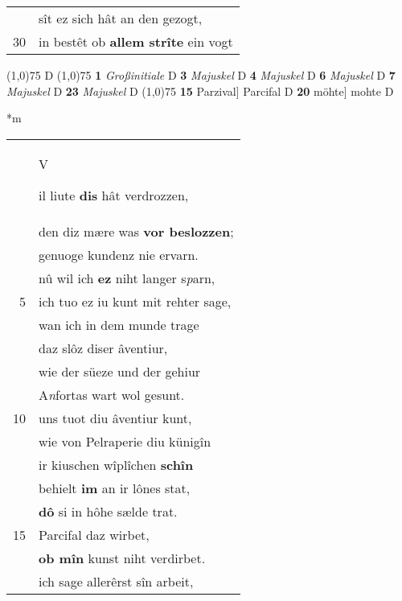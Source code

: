 \documentclass[8pt,a4paper,notitlepage]{article}
\begin{document}
\begin{table}[ht]
\begin{minipage}[t]{0.5\linewidth}
\begin{tabular}{rl}
 & sît ez sich hât an den gezogt,\\ 
30 & in bestêt ob \textbf{allem strîte} ein vogt\\ 
\end{tabular}
\scriptsize
\line(1,0){75} \newline
D \newline
\line(1,0){75} \newline
\textbf{1} \textit{Großinitiale} D  \textbf{3} \textit{Majuskel} D  \textbf{4} \textit{Majuskel} D  \textbf{6} \textit{Majuskel} D  \textbf{7} \textit{Majuskel} D  \textbf{23} \textit{Majuskel} D  \newline
\line(1,0){75} \newline
\textbf{15} Parzival] Parcifal D \textbf{20} möhte] mohte D \newline
\end{minipage}
\hspace{0.5cm}
\begin{minipage}[t]{0.5\linewidth}
\small
\begin{center}*m
\end{center}
\begin{tabular}{rl}
 & \begin{large}V\end{large}il liute \textbf{dis} hât verdrozzen,\\ 
 & den diz mære was \textbf{vor beslozzen};\\ 
 & genuoge kundenz nie ervarn.\\ 
 & nû wil ich \textbf{ez} niht langer s\textit{p}arn,\\ 
5 & ich tuo ez iu kunt mit rehter sage,\\ 
 & wan ich in dem munde trage\\ 
 & daz slôz diser âventiur,\\ 
 & wie der süeze und der gehiur\\ 
 & A\textit{n}fortas wart wol gesunt.\\ 
10 & uns tuot diu âventiur kunt,\\ 
 & wie von Pelraperie diu künigîn\\ 
 & ir kiuschen wîplîchen \textbf{schîn}\\ 
 & behielt \textbf{im} an ir lônes stat,\\ 
 & \textbf{dô} si in hôhe sælde trat.\\ 
15 & Parcifal daz wirbet,\\ 
 & \textbf{ob mîn} kunst niht verdirbet.\\ 
 & ich sage allerêrst sîn arbeit,\\ 

\end{tabular}
\end{minipage}
\end{table}
\end{document}
